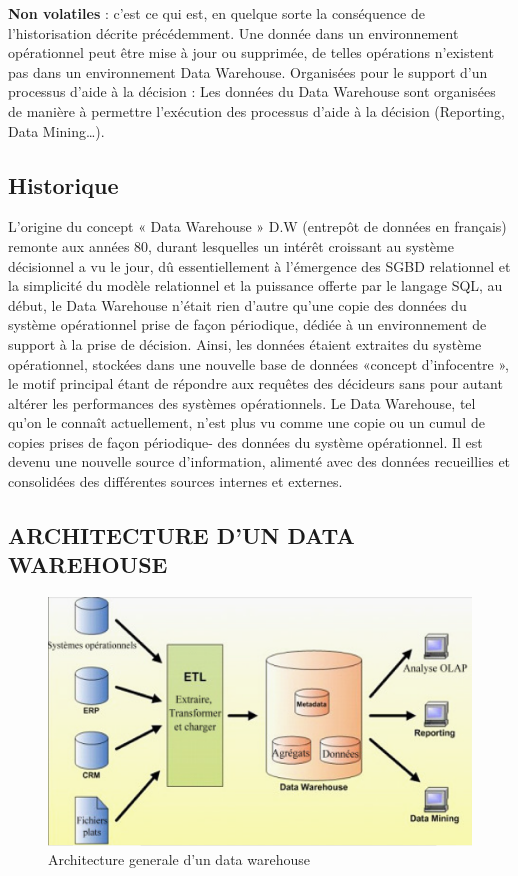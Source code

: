 \textbf{Non volatiles} : c’est ce qui est, en quelque sorte la conséquence de l’historisation décrite précédemment. Une donnée dans un environnement opérationnel peut être mise à jour ou supprimée, de telles opérations n’existent pas dans un environnement Data Warehouse. Organisées pour le support d’un processus d’aide à la décision : Les données du Data Warehouse sont organisées de manière à permettre l’exécution des processus d’aide à la décision (Reporting, Data Mining…).

 \subsection{Historique}
 	L’origine du concept « Data Warehouse » D.W (entrepôt de données en français) remonte aux années 80, durant lesquelles un intérêt croissant au système décisionnel a vu le jour, dû essentiellement à l’émergence des SGBD relationnel et la simplicité du modèle relationnel et la puissance offerte par le langage SQL, au début, le Data Warehouse n’était rien d’autre qu’une copie des données du système opérationnel prise de façon périodique, dédiée à un environnement de support à la prise de décision. Ainsi, les données étaient extraites du système opérationnel, stockées dans une nouvelle base de données «concept d’infocentre », le motif principal étant de répondre aux requêtes des décideurs sans pour autant altérer les performances des systèmes opérationnels. Le Data Warehouse, tel qu’on le connaît actuellement, n’est plus vu comme une copie ou un cumul de copies prises de façon périodique- des données du système opérationnel. Il est devenu une nouvelle source d’information, alimenté avec des données recueillies et consolidées des différentes sources internes et externes.
 
 \subsection{ARCHITECTURE D’UN DATA WAREHOUSE}
 
 	\begin{figure}[h]
	\begin{center}
		\includegraphics[scale=0.85]{images/DataWH.png}
		\caption{Architecture generale d'un data warehouse}
		\label{architecture-data-warehouse}
	\end{center}
\end{figure}

